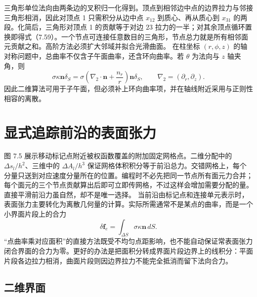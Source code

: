 \documentclass[11pt,a4paper,openany,fontset=none]{ctexbook}
\begin{document}
三角形单位法向由两条边的叉积归一化得到。顶点到相邻边中点的边界拉力与邻接三角形相消，因此对顶点 1 只需积分从边中点 $x_{12}$ 到质心、再从质心到 $x_{31}$ 的两段。化简后，三角形对顶点 1 的贡献等于对边 $23$ 拉力的一半；对其余顶点循环置换即得式（7.59）。一个节点可连接任意数目的三角形，节点总力就是所有相邻面元贡献之和。高阶方法必须扩大邻域并拟合光滑曲面。
在柱坐标 $(r,\phi,z)$ 的轴对称问题中，总曲率不仅含子午面曲率，还含环向曲率。若 $\theta$ 为法向与 $z$ 轴夹角，则
\begin{equation}
 \sigma\kappa\boldsymbol n\delta_S
 =\sigma\left(\nabla_2\cdot\boldsymbol n+\frac{n_r}{r}\right)
 \boldsymbol n\delta_S,
 \qquad \nabla_2=(\partial_r,\partial_z).
 \tag{7.45}
\end{equation}
因此二维算法可用于子午面，但必须补上环向曲率项，并在轴线附近采用与正则性相容的离散。

\section{显式追踪前沿的表面张力}

图 7.5 展示移动标记点附近被权函数覆盖的附加固定网格点。二维分配中的 $\Delta s_l/h^2$、三维中的 $\Delta A_l/h^3$ 保证网格体积积分等于前沿总力。交错网格上，每个分量只送到对应速度分量所在的位置。编程时不必先把同一节点所有面元力合并；每个面元的三个节点贡献算出后即可立即传网格，不过这样会增加需要分配的量。直接平滑前沿力虽自然，却不是唯一选择。
当前沿由标记点和连接单元表示时，表面张力主要转化为离散几何量的计算。实际所需通常不是某点的曲率，而是一个小界面片段上的合力
\begin{equation}
 \delta\boldsymbol f_e=\int_{\Delta S}\sigma\kappa\boldsymbol n\,dS.
 \tag{7.46}
\end{equation}
“点曲率乘对应面积”的直接方法既受不均匀点距影响，也不能自动保证常表面张力闭合界面的合力为零。更好的办法是把面积分转成界面片段边界上的线积分：平面片段各边拉力相消，曲面片段则因边界拉力不能完全抵消而留下法向合力。

\subsection{二维界面}
\end{document}
